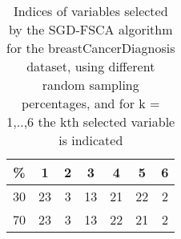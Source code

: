 \begin{table}
	\begin{center}
		\begin{tabular}{c c c c c c c}
			\% & 1 & 2 & 3 & 4 & 5 & 6 \\
			\hline
			30 & 23 & 3 & 13 & 21 & 22 & 2 \\
			70 & 23 & 3 & 13 & 22 & 21 & 2 \\
		\end{tabular}
	\end{center}
	\caption{Indices of variables selected by the SGD-FSCA algorithm for the breastCancerDiagnosis dataset, using different random sampling percentages, and for k = 1,..,6 the kth selected variable is indicated}
\end{table}